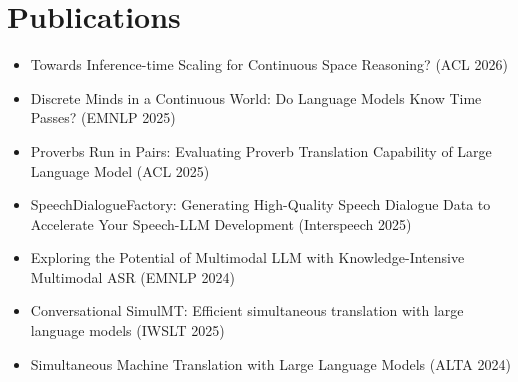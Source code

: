 \documentclass{resume_en}
\begin{document}
\section{Publications}
\begin{itemize}[parsep=0.2ex]
    \item Towards Inference-time Scaling for Continuous Space Reasoning? (ACL 2026)
    \item Discrete Minds in a Continuous World: Do Language Models Know Time Passes? (EMNLP 2025)
    \item Proverbs Run in Pairs: Evaluating Proverb Translation Capability of Large Language Model (ACL 2025)
    \item SpeechDialogueFactory: Generating High-Quality Speech Dialogue Data to Accelerate Your Speech-LLM Development (Interspeech 2025)
    \item Exploring the Potential of Multimodal LLM with Knowledge-Intensive Multimodal ASR (EMNLP 2024)
    \item Conversational SimulMT: Efficient simultaneous translation with large language models (IWSLT 2025)
    \item Simultaneous Machine Translation with Large Language Models (ALTA 2024)

\end{itemize}
\end{document}
